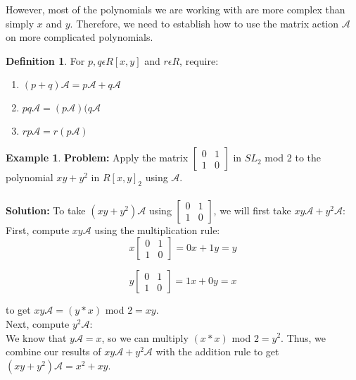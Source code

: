 \documentclass[a4paper,draft]{amsproc}
\theoremstyle{plain}
\theoremstyle{definition}
\newtheorem{exm}{Example}[section]
\newtheorem{dfn}{Definition}[section]
\theoremstyle{remark}
\numberwithin{equation}{section}
\begin{document}
However, most of the polynomials we are working with are more complex than simply $x$ and $y$. Therefore, we need to establish how to use the matrix action $\mathcal{A}$ on more complicated polynomials. 
\begin{dfn}
For $p, q \epsilon R[x,y]$ and $r \epsilon R$, require: 
\begin{enumerate}
\item $(p+q)\mathcal{A} = p\mathcal{A} + q\mathcal{A}$
\item $pq\mathcal{A} = (p\mathcal{A})(q\mathcal{A}$
\item $rp\mathcal{A} = r(p\mathcal{A})$
\end{enumerate}
\end{dfn}

\begin{exm}
\textbf{Problem:} 
Apply the matrix 
$\begin{bmatrix}
 0&1 \\ 
 1&0 
\end{bmatrix}$ in $SL_{2}$ mod $2$ to the polynomial $xy + y^{2}$ in $R[x,y]_{2}$ using $\mathcal{A}.$ \\ \\
\textbf{Solution:} 
To take $(xy + y^{2})\mathcal{A}$ using $\begin{bmatrix}
 0&1 \\ 
 1&0 
\end{bmatrix}$, we will first take $xy\mathcal{A} + y^{2}\mathcal{A}:$ 
First, compute $xy\mathcal{A}$ using the multiplication rule: \\
$$x\begin{bmatrix}
 0&1 \\ 
 1&0 
\end{bmatrix} = 0x + 1y = y$$

$$y\begin{bmatrix}
 0&1 \\ 
 1&0 
\end{bmatrix} = 1x + 0y = x$$

to get  $xy\mathcal{A} = (y*x)$ mod $2 = xy$. \\

Next, compute $y^{2}\mathcal{A}$: \\
We know that $y\mathcal{A} = x$, so we can multiply $(x*x)$ mod $2 = y^{2}$. 
Thus, we combine our results of $xy\mathcal{A} + y^{2}\mathcal{A}$ with the addition rule to get $(xy + y^{2})\mathcal{A} = x^{2} + xy$. 

\end{exm}
\end{document}
